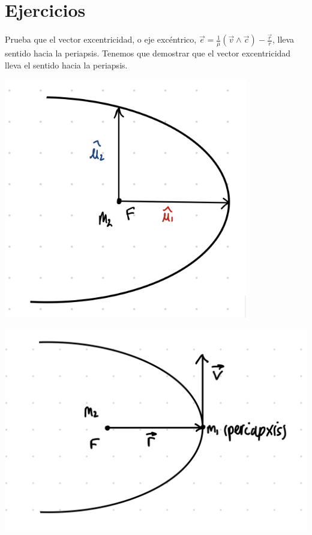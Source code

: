 
\section{Ejercicios}

\tcbstartrecording
\begin{texercise}

	Prueba que el vector excentricidad, o eje excéntrico, $\vec{e} = \frac{1}{\mu} (\vec{v} \wedge \vec{c}) - \frac{\vec{r}}{r}$, lleva sentido hacia la periapsis.
	\tcblower
	Tenemos que demostrar que el vector excentricidad lleva el sentido hacia la periapsis.


	\begin{minipage}{.45\textwidth}
		\includegraphics[width=0.8\textwidth]{Cuerpo/Imagenes/02_Ejercicio_1_1.jpg}
	\end{minipage}	\hfill
	\begin{minipage}{0.45\textwidth}
		\includegraphics[width=1.0\textwidth]{Cuerpo/Imagenes/02_Ejercicio_1_2.png}
	\end{minipage}


\end{texercise}
